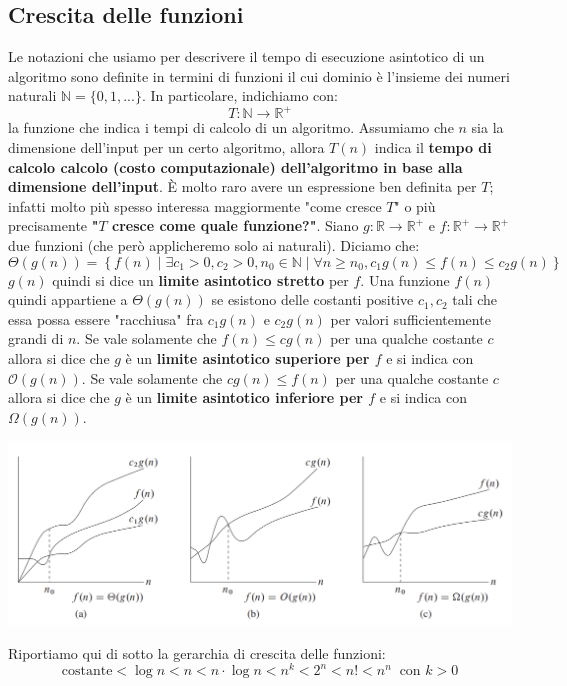 \documentclass[12pt]{article}
\begin{document}
\subsection{Crescita delle funzioni}
Le notazioni che usiamo per descrivere il tempo di esecuzione asintotico di un algoritmo sono definite in termini di funzioni
il cui dominio è l'insieme dei numeri naturali $\mathbb{N} = \{0,1,...\}$. In particolare, indichiamo con:
$$T: \mathbb{N} \rightarrow \mathbb{R}^+$$
la funzione che indica i tempi di calcolo di un algoritmo. Assumiamo che $n$ sia la dimensione dell'input per un certo algoritmo, allora 
$T(n)$ indica il \textbf{tempo di calcolo calcolo (costo computazionale) dell'algoritmo in base alla dimensione dell'input}.
È molto raro avere un espressione ben definita per $T$; infatti molto più spesso interessa maggiormente "come cresce $T$" o più precisamente
\textbf{"$T$ cresce come quale funzione?"}. Siano $g: \mathbb{R} \rightarrow \mathbb{R}^+$ e $f: \mathbb{R}^+ \rightarrow \mathbb{R}^+$ due funzioni (che però applicheremo solo ai naturali).
Diciamo che:
$$\Theta(g(n)) = \left \{f(n)\middle|\exists c_1 >0, c_2 > 0, n_0 \in \mathbb{N}\middle| \forall n \geq n_0, c_1 g(n) \leq f(n) \leq c_2 g(n)\right \}$$
$g(n)$ quindi si dice un \textbf{limite asintotico stretto} per $f$. Una funzione $f(n)$ quindi appartiene a $\Theta(g(n))$ se esistono delle costanti positive $c_1,c_2$ tali che essa possa essere "racchiusa" fra $c_1g(n)$ e $c_2g(n)$ per valori
sufficientemente grandi di $n$. \newline
Se vale solamente che $f(n) \leq c g(n)$ per una qualche costante $c$ allora si dice che $g$ è un \textbf{limite asintotico superiore per $f$} e si indica con $\mathcal{O}(g(n))$. \newline
Se vale solamente che $c g(n) \leq f(n)$ per una qualche costante $c$ allora si dice che $g$ è un \textbf{limite asintotico inferiore per $f$} e si indica con $\Omega(g(n))$. \newline
\begin{center}
    \includegraphics[width = 1\linewidth]{Images/1.png}
\end{center}
Riportiamo qui di sotto la gerarchia di crescita delle funzioni:
$$\textrm{costante} < \log{n} < n < n \cdot \log n < n^k < 2^n < n! < n^n \; \; \textrm{con } k > 0$$
\end{document}

